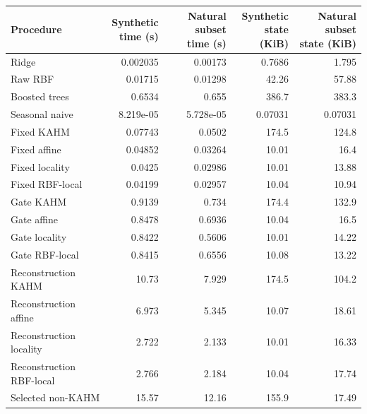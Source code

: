 \begin{tabular}{lrrrr}
\toprule
Procedure & \shortstack{Synthetic\\time (s)} & \shortstack{Natural subset\\time (s)} & \shortstack{Synthetic\\state (KiB)} & \shortstack{Natural subset\\state (KiB)} \\
\midrule
Ridge & 0.002035 & 0.00173 & 0.7686 & 1.795 \\
Raw RBF & 0.01715 & 0.01298 & 42.26 & 57.88 \\
Boosted trees & 0.6534 & 0.655 & 386.7 & 383.3 \\
Seasonal naive & 8.219e-05 & 5.728e-05 & 0.07031 & 0.07031 \\
Fixed KAHM & 0.07743 & 0.0502 & 174.5 & 124.8 \\
Fixed affine & 0.04852 & 0.03264 & 10.01 & 16.4 \\
Fixed locality & 0.0425 & 0.02986 & 10.01 & 13.88 \\
Fixed RBF-local & 0.04199 & 0.02957 & 10.04 & 10.94 \\
Gate KAHM & 0.9139 & 0.734 & 174.4 & 132.9 \\
Gate affine & 0.8478 & 0.6936 & 10.04 & 16.5 \\
Gate locality & 0.8422 & 0.5606 & 10.01 & 14.22 \\
Gate RBF-local & 0.8415 & 0.6556 & 10.08 & 13.22 \\
Reconstruction KAHM & 10.73 & 7.929 & 174.5 & 104.2 \\
Reconstruction affine & 6.973 & 5.345 & 10.07 & 18.61 \\
Reconstruction locality & 2.722 & 2.133 & 10.01 & 16.33 \\
Reconstruction RBF-local & 2.766 & 2.184 & 10.04 & 17.74 \\
Selected non-KAHM & 15.57 & 12.16 & 155.9 & 17.49 \\
\bottomrule
\end{tabular}
